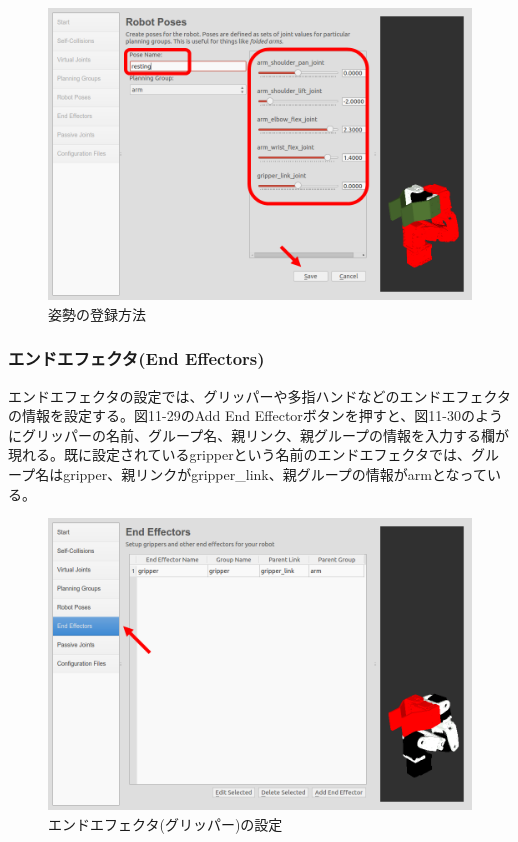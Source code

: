 \begin{figure}[htp]
  \centering
  \includegraphics[width=12cm]{pictures/chapter11/pic_11_28.png}
  \caption{姿勢の登録方法}
\end{figure}

\subsubsection{エンドエフェクタ(End Effectors)}

エンドエフェクタの設定では、グリッパーや多指ハンドなどのエンドエフェクタの情報を設定する。図11-29のAdd End Effectorボタンを押すと、図11-30のようにグリッパーの名前、グループ名、親リンク、親グループの情報を入力する欄が現れる。既に設定されているgripperという名前のエンドエフェクタでは、グループ名はgripper、親リンクがgripper\_link、親グループの情報がarmとなっている。

\begin{figure}[htp]
  \centering
  \includegraphics[width=12cm]{pictures/chapter11/pic_11_29.png}
  \caption{エンドエフェクタ(グリッパー)の設定}
\end{figure}

